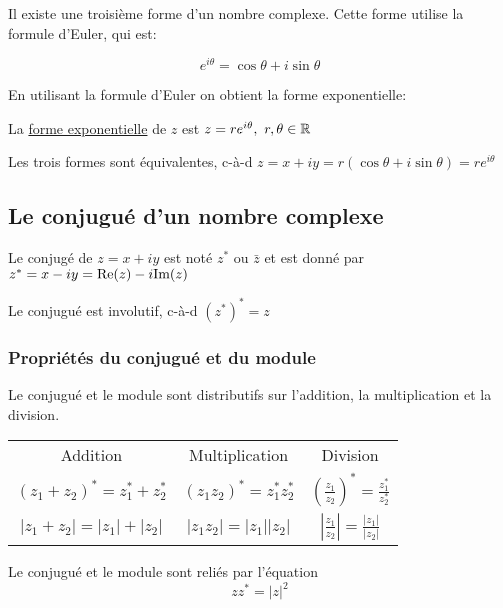 Il existe une troisième forme d'un nombre complexe. Cette forme utilise la formule d'Euler, qui est:
\begin{theorem}
    \[ e^{i\theta} = \cos{\theta} + i\sin{\theta} \]
\end{theorem}
En utilisant la formule d'Euler on obtient la forme exponentielle:
\begin{definition}
    La \underline{forme exponentielle} de $z$ est $z = re^{i\theta}, \ r, \theta \in \mathbb{R}$
\end{definition}
\begin{note}
    Les trois formes sont équivalentes, c-à-d $z = x + iy = r(\cos{\theta} + i\sin{\theta}) = re^{i\theta}$
\end{note}

\begingroup
\renewcommand{\arraystretch}{1.5}

\subsection{Le conjugué d'un nombre complexe}
\begin{definition}
    Le conjugé de $z = x + iy$ est noté $z^*$ ou $\bar{z}$ et est donné par $z^* = x - iy = \text{Re}(z) - i\text{Im}(z)$
\end{definition}
\begin{remark}
    Le conjugué est involutif, c-à-d $\left(z^* \right)^* = z$
\end{remark}

\subsubsection{Propriétés du conjugué et du module}
Le conjugué et le module sont distributifs sur l'addition, la multiplication et la division.
\begin{center}
    \begin{tabular}{c@{\hskip 1in} c@{\hskip 1in} c}
        Addition & Multiplication & Division \\
        $\left(z_1 + z_2\right)^* = z_1^* + z_2^*$ &  $\left(z_1z_2\right)^* = z_1^{*} z_2^*$ &  $\left( \frac{z_1}{z_2}\right)^{*} = \frac{z_1^*}{z_2^*}$  \\
        $\left|z_1 + z_2\right| = |z_1| + |z_2|$   & $\left|z_1z_2\right| = |z_1||z_2|$      &  $\left| \frac{z_1}{z_2}\right| = \frac{|z_1|}{|z_2|}$
    \end{tabular}
\end{center}
Le conjugué et le module sont reliés par l'équation
\[
zz^* = |z|^2
\]
